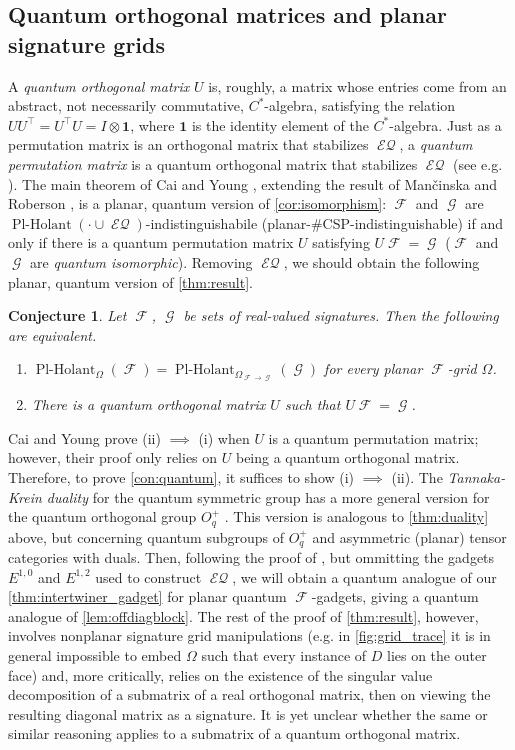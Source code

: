 \documentclass{article}
\newtheorem{conjecture}{Conjecture}[section]
\theoremstyle{remark}
\theoremstyle{definition}
\DeclareMathOperator{\fc}{\mathcal{F}}
\DeclareMathOperator{\gc}{\mathcal{G}}
\DeclareMathOperator{\plholant}{Pl-Holant}
\DeclareMathOperator{\eq}{\mathcal{EQ}}
\begin{document}
\subsection{Quantum orthogonal matrices and planar signature grids}
A \emph{quantum orthogonal matrix} $U$ is, roughly, a matrix whose entries come from an abstract,
not necessarily commutative,
$C^*$-algebra, satisfying the relation $UU^\top = U^\top U = I \otimes \mathbf{1}$, where $\mathbf{1}$
is the identity element of the $C^*$-algebra.
Just as a permutation matrix is an orthogonal matrix that stabilizes $\eq$, 
a \emph{quantum permutation matrix} is a quantum orthogonal matrix that
stabilizes $\eq$ (see e.g. \cite[Equation 27]{cai_planar_2023}). The main theorem of Cai and Young
\cite{cai_planar_2023}, extending the result of Man\v{c}inska and Roberson \cite{planar}, is a planar,
quantum version of \autoref{cor:isomorphism}:
$\fc$ and $\gc$ are $\plholant(\cdot \cup \eq)$-indistinguishabile 
(planar-\#CSP-indistinguishable) if and only if there is a quantum permutation matrix $U$ satisfying
$U \fc = \gc$ ($\fc$ and $\gc$ are \emph{quantum isomorphic}). 
Removing $\eq$, we should obtain the following planar, quantum version of \autoref{thm:result}.
\begin{conjecture}
    \label{con:quantum}
    Let $\fc$, $\gc$ be sets of real-valued signatures. Then the following are equivalent.
    \begin{enumerate}[label=(\roman*)]
        \item $\plholant_{\Omega}(\fc) = \plholant_{\Omega_{\fc\to\gc}}(\gc)$
        for every planar $\fc$-grid $\Omega$.
        \item There is a quantum orthogonal matrix $U$ such that $U\fc = \gc$.
    \end{enumerate}
\end{conjecture}
Cai and Young \cite[Theorem 5]{cai_planar_2023} prove (ii) $\implies$ (i) when $U$ is a quantum permutation matrix;
however, their proof only relies on $U$ being a quantum orthogonal matrix. Therefore,
to prove \autoref{con:quantum}, it suffices to show (i) $\implies$ (ii). The \emph{Tannaka-Krein duality}
for the quantum symmetric group \cite[Theorem 3]{cai_planar_2023} has a more general version
for the quantum orthogonal group $O_q^+$ \cite[Theorem 2.13]{planar}. This version is
analogous to \autoref{thm:duality} above, but concerning quantum subgroups of $O_q^+$ and asymmetric
(planar) tensor categories with duals. Then, following the proof of \cite[Theorem 4]{cai_planar_2023},
but ommitting the gadgets $E^{1,0}$ and $E^{1,2}$ used to construct $\eq$, we will obtain a quantum analogue
of our \autoref{thm:intertwiner_gadget} for planar quantum $\fc$-gadgets, giving a quantum
analogue of \autoref{lem:offdiagblock}. The rest of the proof of \autoref{thm:result}, however, involves
nonplanar signature grid manipulations (e.g. in \autoref{fig:grid_trace} it is in general impossible to embed $\Omega$ such that 
every instance of $D$ lies on the outer face) and, more critically, relies on the existence of the
singular value decomposition of a submatrix of a real orthogonal matrix, then on viewing the resulting
diagonal matrix as a signature. It is yet unclear whether the same or similar reasoning applies to a
submatrix of a quantum orthogonal matrix.
 
\end{document}
